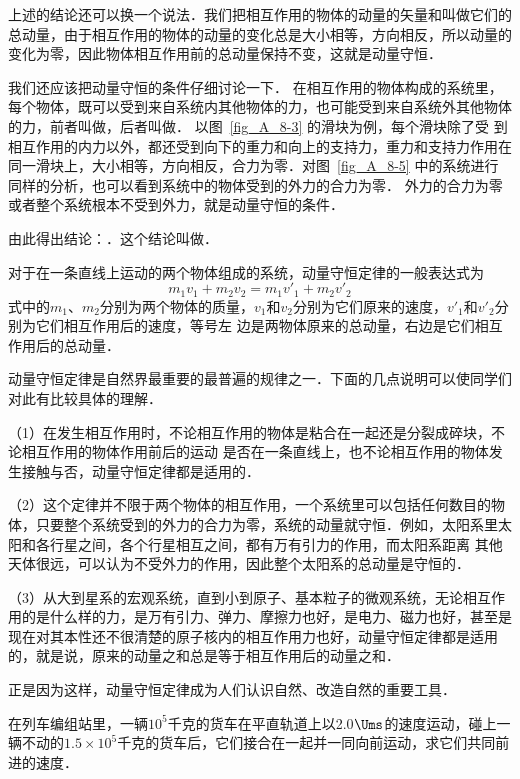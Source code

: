 上述的结论还可以换一个说法．我们把相互作用的物体的动量的矢量和叫做它们的总动量，由于相互作用的物体的动量的变化总是大小相等，方向相反，所以动量的变化为零，因此物体相互作用前的总动量保持不变，这就是动量守恒．

我们还应该把动量守恒的条件仔细讨论一下．
在相互作用的物体构成的系统里，每个物体，既可以受到来自系统内其他物体的力，也可能受到来自系统外其他物体的力，前者叫做，后者叫做．
以图~\ref{fig_A_8-3} 的滑块为例，每个滑块除了受
到相互作用的内力以外，都还受到向下的重力和向上的支持力，重力和支持力作用在同一滑块上，大小相等，方向相反，合力为零．对图~\ref{fig_A_8-5} 中的系统进行同样的分析，也可以看到系统中的物体受到的外力的合力为零．
外力的合力为零或者整个系统根本不受到外力，就是动量守恒的条件．

由此得出结论：．这个结论叫做．

对于在一条直线上运动的两个物体组成的系统，动量守恒定律的一般表达式为
\[m_1v_1+m_2v_2=m_1v'_1+m_2v'_2 \]
式中的$m_1$、$m_2$分别为两个物体的质量，$v_1$和$v_2$分别为它们原来的速度，$v'_1$和$v'_2$分别为它们相互作用后的速度，等号左
边是两物体原来的总动量，右边是它们相互作用后的总动量．

动量守恒定律是自然界最重要的最普遍的规律之一．下面的几点说明可以使同学们对此有比较具体的理解．

（1）在发生相互作用时，不论相互作用的物体是粘合在一起还是分裂成碎块，不论相互作用的物体作用前后的运动
是否在一条直线上，也不论相互作用的物体发生接触与否，动量守恒定律都是适用的．

（2）这个定律并不限于两个物体的相互作用，一个系统里可以包括任何数目的物体，只要整个系统受到的外力的合力为零，系统的动量就守恒．例如，太阳系里太阳和各行星之间，各个行星相互之间，都有万有引力的作用，而太阳系距离
其他天体很远，可以认为不受外力的作用，因此整个太阳系的总动量是守恒的．

（3）从大到星系的宏观系统，直到小到原子、基本粒子的微观系统，无论相互作用的是什么样的力，是万有引力、弹力、摩擦力也好，是电力、磁力也好，甚至是现在对其本性还不很清楚的原子核内的相互作用力也好，动量守恒定律都是适用的，就是说，原来的动量之和总是等于相互作用后的动量之和．

正是因为这样，动量守恒定律成为人们认识自然、改造自然的重要工具．


\begin{example}
    在列车编组站里，一辆$10^5$千克的货车在平直轨道上以2.0$\Ums$的速度运动，碰上一辆不动的$1.5\times 10^5$千克的货车后，它们接合在一起并一同向前运动，求它们共同前进的速度．
\end{example}


